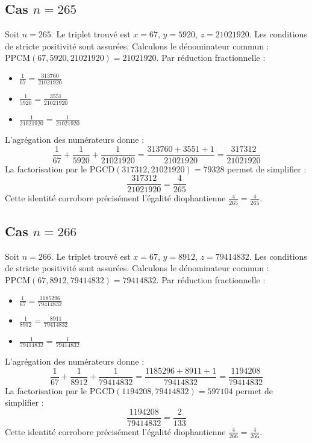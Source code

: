 \documentclass[11pt,a4paper]{article}
\begin{document}
\subsection{Cas $n = 265$}
Soit $n = 265$. Le triplet trouvé est $x = 67$, $y = 5920$, $z = 21021920$.
Les conditions de stricte positivité sont assurées.
Calculons le dénominateur commun : $\text{PPCM}(67, 5920, 21021920) = 21021920$.
Par réduction fractionnelle :
\begin{itemize}
    \item $\frac{1}{67} = \frac{313760}{21021920}$
    \item $\frac{1}{5920} = \frac{3551}{21021920}$
    \item $\frac{1}{21021920} = \frac{1}{21021920}$
\end{itemize}
L'agrégation des numérateurs donne :
$$ \frac{1}{67} + \frac{1}{5920} + \frac{1}{21021920} = \frac{313760 + 3551 + 1}{21021920} = \frac{317312}{21021920} $$
La factorisation par le $\text{PGCD}(317312, 21021920) = 79328$ permet de simplifier :
$$ \frac{317312}{21021920} = \frac{4}{265} $$
Cette identité corrobore précisément l'égalité diophantienne $\frac{4}{265} = \frac{4}{265}$.

\subsection{Cas $n = 266$}
Soit $n = 266$. Le triplet trouvé est $x = 67$, $y = 8912$, $z = 79414832$.
Les conditions de stricte positivité sont assurées.
Calculons le dénominateur commun : $\text{PPCM}(67, 8912, 79414832) = 79414832$.
Par réduction fractionnelle :
\begin{itemize}
    \item $\frac{1}{67} = \frac{1185296}{79414832}$
    \item $\frac{1}{8912} = \frac{8911}{79414832}$
    \item $\frac{1}{79414832} = \frac{1}{79414832}$
\end{itemize}
L'agrégation des numérateurs donne :
$$ \frac{1}{67} + \frac{1}{8912} + \frac{1}{79414832} = \frac{1185296 + 8911 + 1}{79414832} = \frac{1194208}{79414832} $$
La factorisation par le $\text{PGCD}(1194208, 79414832) = 597104$ permet de simplifier :
$$ \frac{1194208}{79414832} = \frac{2}{133} $$
Cette identité corrobore précisément l'égalité diophantienne $\frac{4}{266} = \frac{4}{266}$.
\end{document}
